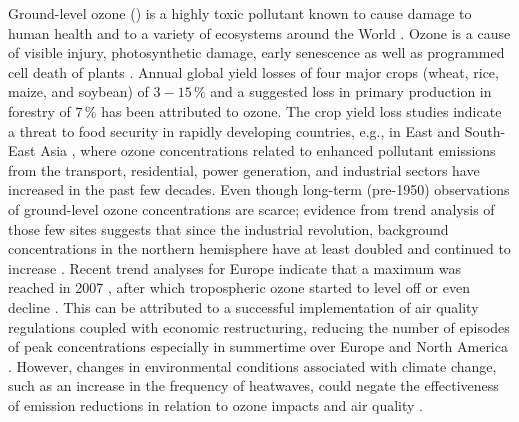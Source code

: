 \documentclass[bg, manuscript]{copernicus}
\begin{document}
\introduction  %
\label{sec:intro}

Ground-level ozone () is a highly toxic pollutant known to cause damage to human health \citep{WHO2008} and to a variety of ecosystems around the World \citep{PT:Emberson2020}. Ozone is a cause of visible injury, photosynthetic damage, early senescence as well as programmed cell death of plants \citep{PCE:Kangasjarvi2005}. Annual global yield losses of four major crops (wheat, rice, maize, and soybean) of $3-15\,\unit{\%}$ \citep{PJ:Ainsworth2017} and a suggested loss in primary production in forestry of $7\,\unit{\%}$ \citep{GCB:Wittig2009,EP:Matyssek2012} has been attributed to ozone.
The crop yield loss studies indicate a threat to food security in rapidly developing countries, e.g., in East and South-East Asia \citep{GCB:Tang2013,NCC:Tai2014,AE:Chuwah2015,GCB:Mills2018}, where ozone concentrations related to enhanced pollutant emissions from the transport, residential, power generation, and industrial sectors have increased in the past few decades. Even though long-term (pre-1950) observations of ground-level ozone concentrations are scarce; evidence from trend analysis of those few sites suggests that since the industrial revolution, background concentrations in the northern hemisphere have at least doubled and continued to increase \citep[Chapter 2]{IPCC2013}. Recent trend analyses for Europe indicate that a maximum was reached in 2007 \citep{AE:Derwent2018}, after which tropospheric ozone started to level off or even decline \citep{ESA:Cooper2014, ACP:Wespes2018,ESA:Gaudel2018}. This can be attributed to a successful implementation of air quality regulations coupled with economic restructuring, reducing the number of episodes of peak concentrations especially in summertime over Europe and North America \citep[e.g.,][]{ESA:Fleming2018, ESA:Mills2018}. However, changes in environmental conditions associated with climate change, such as an increase in the frequency of heatwaves, could negate the effectiveness of emission reductions in relation to ozone impacts and air quality \citep{NCC:Lin2020}.
\end{document}
